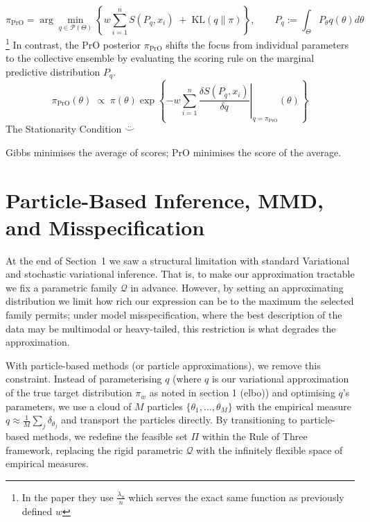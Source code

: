 \documentclass[11pt,a4paper]{article}
\newcommand{\add}[1]{{\color{red}#1}}
\begin{document}
$$\pi_{\mathrm{PrO}} = \arg\min_{q\in\mathcal{P}(\Theta)}\left\{ w\sum_{i=1}^{n} S(P_q, x_i) \;+\; \mathrm{KL}(q\|\pi) \right\}, \qquad P_q := \int_\Theta P_\theta q(\theta)d\theta$$
\footnote{In the paper they use $\frac{\lambda_n}{n}$ which serves the exact same function as previously defined $w$}
In contrast, the PrO posterior $\pi_{\mathrm{PrO}}$ shifts the focus from individual parameters to the collective ensemble by evaluating the scoring rule on the marginal predictive distribution $P_q$.
$$\pi_{\mathrm{PrO}}(\theta) \;\propto\; \pi(\theta)\exp\left\{ -w\sum_{i=1}^{n} \left.\frac{\delta S(P_q, x_i)}{\delta q}\right|_{q=\pi_{\mathrm{PrO}}}(\theta) \right\}$$
\add{The Stationarity Condition $\overset{..}{\smile}$}

Gibbs minimises the average of scores; PrO minimises the score of the average.

\section{Particle-Based Inference, MMD, and Misspecification}

At the end of Section~1 we saw a structural limitation with standard Variational and stochastic variational inference. That is, to make our approximation tractable we fix a parametric family $\mathcal{Q}$ in advance. However, by setting an approximating distribution we limit how rich our expression can be to the maximum
the selected family permits; under model misspecification, where the best description of the data may be multimodal or heavy-tailed, this restriction is what degrades the approximation.

With particle-based methods (or particle approximations), we remove this constraint. Instead of parameterising $q$ (where $q$ is our variational approximation of the true target distribution $\pi_w$ as noted in section 1 (elbo)) and optimising $q$'s parameters, we use a cloud of $M$ particles $\{\theta_1,\dots,\theta_M\}$ with the
empirical measure $q \approx \tfrac{1}{M}\sum_{j} \delta_{\theta_j}$ and transport the particles
directly. By transitioning to particle-based methods, we redefine the feasible set $\Pi$ within the Rule of Three framework, replacing the rigid parametric $\mathcal{Q}$ with the infinitely flexible space of empirical measures.
\end{document}
